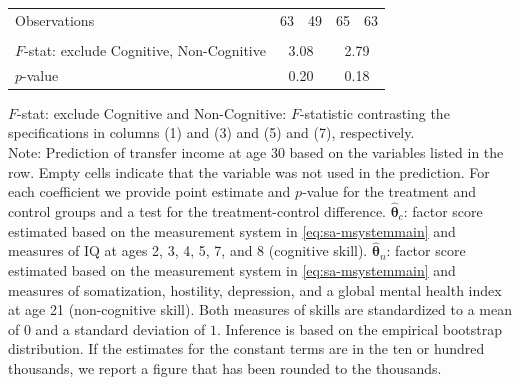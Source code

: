 \documentclass[static]{JJH-Beamer}
\begin{document}
\begin{frame}
\begin{table}[H]
\begin{center}
{\begin{tabular}{lcccccccc}
Observations &        \multicolumn{2}{c}{63} &               \multicolumn{2}{c}{49}  &             \multicolumn{2}{c}{65}  &         \multicolumn{2}{c}{63}  \\   \\
\midrule
$F$-stat: exclude Cognitive, Non-Cognitive &                    \multicolumn{4}{c}{3.08} &                   \multicolumn{4}{c}{2.79}  \\
$p$-value &              \multicolumn{4}{c}{0.20} &                    \multicolumn{4}{c}{0.18}  \\
\bottomrule
\end{tabular}
}
\end{center}
\tiny \flushleft
$F$-stat: exclude Cognitive and Non-Cognitive: $F$-statistic contrasting the specifications in columns (1) and (3) and (5) and (7), respectively.\\
Note: Prediction of transfer income at age 30 based on the variables listed in the row. Empty cells indicate that the variable was not used in the prediction. For each coefficient we provide point estimate and $p$-value for the treatment and control groups and a test for the treatment-control difference. $\hat{\bm{\theta}}_{c}$: factor score estimated based on the measurement system in \eqref{eq:sa-msystemmain} and measures of IQ at ages 2, 3, 4, 5, 7, and 8 (cognitive skill). $\hat{\bm{\theta}}_{n}$: factor score estimated based on the measurement system in \eqref{eq:sa-msystemmain} and measures of somatization, hostility, depression, and a global mental health index at age 21 (non-cognitive skill). Both measures of skills are standardized to a mean of $0$ and a standard deviation of $1$. Inference is based on the empirical bootstrap distribution. If the estimates for the constant terms are in the ten or hundred thousands, we report a figure that has been rounded to the thousands.\\
\end{table}

\end{frame}
\end{document}
